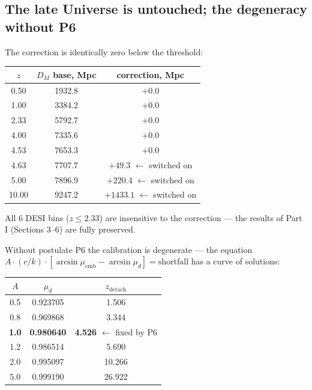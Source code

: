 \documentclass[a4paper,10pt]{article}
\begin{document}
\subsection{The late Universe is untouched; the degeneracy without P6}

The correction is identically zero below the threshold:

\begin{table}[htbp]
\centering
\small
\begin{tabular}{@{}ccc@{}}
\toprule
$z$ & $D_M$ base, Mpc & correction, Mpc \\
\midrule
0.50 & 1932.8 & $+0.0$ \\
1.00 & 3384.2 & $+0.0$ \\
2.33 & 5792.7 & $+0.0$ \\
4.00 & 7335.6 & $+0.0$ \\
4.53 & 7653.3 & $+0.0$ \\
4.63 & 7707.7 & $+49.3$ \; $\leftarrow$ switched on \\
5.00 & 7896.9 & $+220.4$ \; $\leftarrow$ switched on \\
10.00 & 9247.2 & $+1433.1$ \; $\leftarrow$ switched on \\
\bottomrule
\end{tabular}
\end{table}

All 6 DESI bins ($z \le 2.33$) are insensitive to the correction --- the results of Part I (Sections 3--6) are fully preserved.

Without postulate P6 the calibration is degenerate --- the equation $A\cdot(c/k)\cdot[\arcsin\mu_{\text{cmb}} - \arcsin\mu_d] = \text{shortfall}$ has a curve of solutions:

\begin{table}[htbp]
\centering
\small
\begin{tabular}{@{}ccc@{}}
\toprule
$A$ & $\mu_d$ & $z_{\text{detach}}$ \\
\midrule
0.5 & 0.923705 & 1.506 \\
0.8 & 0.969868 & 3.344 \\
\textbf{1.0} & \textbf{0.980640} & \textbf{4.526} \; $\leftarrow$ fixed by P6 \\
1.2 & 0.986514 & 5.690 \\
2.0 & 0.995097 & 10.266 \\
5.0 & 0.999190 & 26.922 \\
\bottomrule
\end{tabular}
\end{table}
\end{document}
